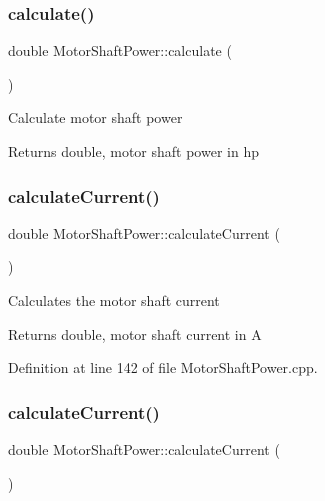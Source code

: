 \subsubsection{\texorpdfstring{calculate()}{calculate()}\hspace{0.1cm}{\footnotesize\ttfamily [3/3]}}
{\footnotesize\ttfamily double Motor\+Shaft\+Power\+::calculate (\begin{DoxyParamCaption}{ }\end{DoxyParamCaption})}

Calculate motor shaft power

\begin{DoxyReturn}{Returns}
double, motor shaft power in hp 
\end{DoxyReturn}
\mbox{\label{class_motor_shaft_power_a3ce530d426fa14223199d89f54f34244}} 
\subsubsection{\texorpdfstring{calculate\+Current()}{calculateCurrent()}\hspace{0.1cm}{\footnotesize\ttfamily [1/3]}}
{\footnotesize\ttfamily double Motor\+Shaft\+Power\+::calculate\+Current (\begin{DoxyParamCaption}{ }\end{DoxyParamCaption})}

Calculates the motor shaft current

\begin{DoxyReturn}{Returns}
double, motor shaft current in A 
\end{DoxyReturn}


Definition at line 142 of file Motor\+Shaft\+Power.\+cpp.

\mbox{\label{class_motor_shaft_power_a3ce530d426fa14223199d89f54f34244}} 
\subsubsection{\texorpdfstring{calculate\+Current()}{calculateCurrent()}\hspace{0.1cm}{\footnotesize\ttfamily [2/3]}}
{\footnotesize\ttfamily double Motor\+Shaft\+Power\+::calculate\+Current (\begin{DoxyParamCaption}{ }\end{DoxyParamCaption})}

